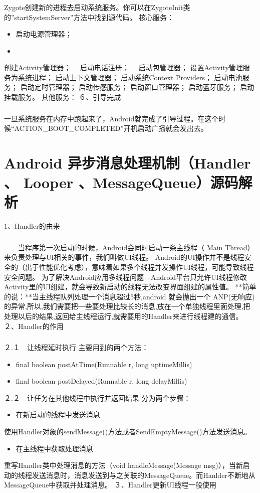 \documentclass[9pt, b5paper]{article}
\begin{document}
\subsubsection{}
\label{sec-5-0-5}
Zygote创建新的进程去启动系统服务。你可以在ZygoteInit类的”startSystemServer”方法中找到源代码。
核心服务：
\begin{itemize}
\item 启动电源管理器；　
\item 
\end{itemize}
创建Activity管理器；　
启动电话注册；　
启动包管理器；
设置Activity管理服务为系统进程；
启动上下文管理器；
启动系统Context Providers；
启动电池服务；
启动定时管理器；
启动传感服务；
启动窗口管理器；
启动蓝牙服务；
启动挂载服务。
其他服务：
 ６、引导完成
\subsubsection{}
\label{sec-5-0-6}
一旦系统服务在内存中跑起来了，Android就完成了引导过程。在这个时候“ACTION\_BOOT\_COMPLETED”开机启动广播就会发出去。
\section{Android 异步消息处理机制（Handler 、 Looper 、MessageQueue）源码解析}
\label{sec-6}
1、Handler的由来
\subsubsection{}
\label{sec-6-0-1}
 　　当程序第一次启动的时候，Android会同时启动一条主线程（ Main Thread）来负责处理与UI相关的事件，我们叫做UI线程。
Android的UI操作并不是线程安全的（出于性能优化考虑），意味着如果多个线程并发操作UI线程，可能导致线程安全问题。 
为了解决Android应用多线程问题—Android平台只允许UI线程修改Activity里的UI组建，就会导致新启动的线程无法改变界面组建的属性值。
**简单的说：**当主线程队列处理一个消息超过5秒,android 就会抛出一个 ANP(无响应)的异常,所以,我们需要把一些要处理比较长的消息,放在一个单独线程里面处理,把处理以后的结果,返回给主线程运行,就需要用的Handler来进行线程建的通信。
 ２、Handler的作用
\subsubsection{}
\label{sec-6-0-2}
２.１　让线程延时执行
主要用到的两个方法：
\begin{itemize}
\item final boolean    postAtTime(Runnable r, long uptimeMillis)
\item final boolean    postDelayed(Runnable r, long delayMillis)
\end{itemize}
２.２　让任务在其他线程中执行并返回结果
分为两个步骤：
\begin{itemize}
\item 在新启动的线程中发送消息
\end{itemize}
使用Handler对象的sendMessage()方法或者SendEmptyMessage()方法发送消息。
\begin{itemize}
\item 在主线程中获取处理消息
\end{itemize}
重写Handler类中处理消息的方法（void handleMessage(Message msg)），当新启动的线程发送消息时，消息发送到与之关联的MessageQueue。而Hanlder不断地从MessageQueue中获取并处理消息。
 ３、Handler更新UI线程一般使用
\end{document}
